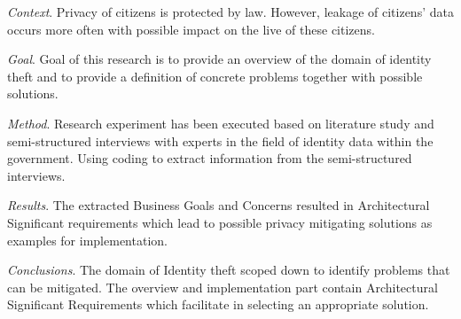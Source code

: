 


\begin{abstracts}        %

\noindent \textit{Context}. 
Privacy of citizens is protected by law. However, leakage of citizens' data occurs more often with possible impact on the live of these citizens.

\noindent \textit{Goal}. 
Goal of this research is to provide an overview of the domain of identity theft and to provide a definition of concrete problems together with possible solutions.

\noindent \textit{Method}. 
Research experiment has been executed based on literature study and semi-structured interviews with experts in the field of identity data within the government. 
Using coding to extract information from the semi-structured interviews.

\noindent \textit{Results}. 
The extracted Business Goals and Concerns resulted in Architectural Significant requirements which lead to possible privacy mitigating solutions as examples for implementation.

\noindent \textit{Conclusions}. 
The domain of Identity theft scoped down to identify problems that can be mitigated. The overview and implementation part contain Architectural Significant Requirements which facilitate in selecting an appropriate solution. 

\end{abstracts}


